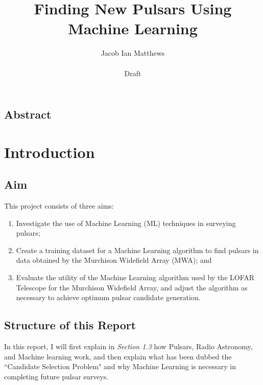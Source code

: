 \documentclass{article}
\title{Finding New Pulsars Using Machine Learning}
\author{Jacob Ian Matthews \\ \\ Draft}
\begin{document}
\begin{titlepage}
    
    \maketitle

    \section*{Abstract}

\end{titlepage}

\pagebreak

\tableofcontents

\pagebreak


\section{Introduction}

\subsection{Aim}

This project consists of three aims:
\begin{enumerate}[label=\roman*.]
    \item Investigate the use of Machine Learning (ML) techniques in surveying pulsars;
    \item Create a training dataset for a Machine Learning algorithm to find pulsars in data obtained by the Murchison Widefield Array (MWA); and
    \item Evaluate the utility of the Machine Learning algorithm used by the LOFAR Telescope for the Murchison Widefield Array, and adjust the algorithm as necessary to achieve optimum pulsar candidate generation.
\end{enumerate}

\subsection{Structure of this Report}

In this report, I will first explain in \emph{Section 1.3} how Pulsars, Radio Astronomy, and Machine learning work, and then explain what has been dubbed the ``Candidate Selection Problem" \autocite{lyon} and why Machine Learning is necessary in completing future pulsar surveys.
\end{document}
